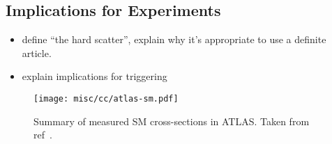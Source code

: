 \subsection{Implications for Experiments}
\label{sec:det-design}
\begin{itemize}
\item define ``the hard scatter'', explain why it's appropriate to use a definite article.
\item explain implications for triggering
\end{itemize}
\begin{figure}
  \texttt{[image: misc/cc/atlas-sm.pdf]}
  \caption[Summary of measured SM cross-sections in ATLAS]{%
    Summary of measured SM cross-sections in ATLAS. Taken from ref~\cite{atlas-sm}.}
\end{figure}
